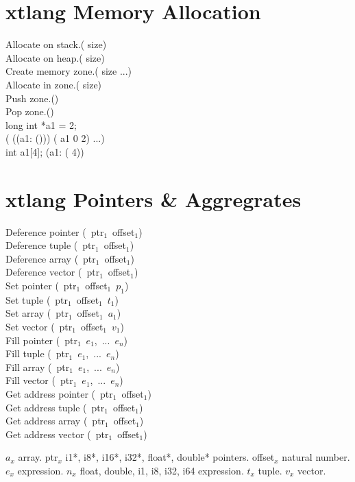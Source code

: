 \documentclass[10pt, twoside]{article}   	%
\begin{document}
\begin{multicols}{3}
\section*{xtlang Memory Allocation}
Allocate on stack.\hfill( size) \\
Allocate on heap.\hfill( size) \\
Create memory zone.\hfill( size ...) \\
Allocate in zone.\hfill( size) \\
Push zone.\hfill() \\
Pop zone.\hfill() \\
long int *a1 = 2; \\
\hphantom{.}\hfill ( ((a1: ())) ( a1 0 2) ...) \\
int a1[4]; 	\hfill(a1: ( 4))


\section*{xtlang Pointers \& Aggregrates}
Deference pointer	\hfill(~ptr$_1$~offset$_1$) \\
Deference tuple	\hfill(~ptr$_1$~offset$_1$) \\
Deference array	\hfill(~ptr$_1$~offset$_1$) \\
Deference vector	\hfill(~ptr$_1$~offset$_1$) \\
Set pointer		\hfill(~ptr$_1$~offset$_1$~$p_1$) \\
Set tuple			\hfill(~ptr$_1$~offset$_1$~$t_1$) \\
Set array			\hfill(~ptr$_1$~offset$_1$~$a_1$) \\
Set vector			\hfill(~ptr$_1$~offset$_1$~$v_1$) \\
Fill pointer			\hfill(~ptr$_1$~$e_1$,~...~$e_n$) \\
Fill tuple			\hfill(~ptr$_1$~$e_1$,~...~$e_n$) \\
Fill array			\hfill(~ptr$_1$~$e_1$,~...~$e_n$) \\
Fill vector	 		\hfill(~ptr$_1$~$e_1$,~...~$e_n$) \\
Get address pointer	\hfill(~ptr$_1$~offset$_1$) \\
Get address tuple	\hfill(~ptr$_1$~offset$_1$) \\
Get address array	\hfill(~ptr$_1$~offset$_1$) \\
Get address vector	\hfill(~ptr$_1$~offset$_1$) \\
\scriptsize
{\raggedright
$a_x$ array.
ptr$_x$ i1*, i8*, i16*, i32*, float*, double* pointers.
offset$_x$ natural number.
$e_x$ expression.
$n_x$ float, double, i1, i8, i32, i64 expression.
$t_x$ tuple.
$v_x$ vector.
\par}
\normalsize



\end{multicols}
\end{document}
